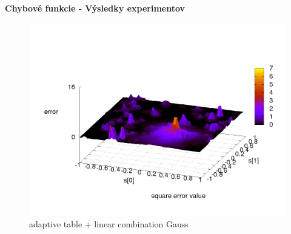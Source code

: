 \documentclass[xcolor=dvipsnames]{beamer}
\begin{document}
\begin{frame}{\bf Chybové funkcie - Výsledky experimentov}
\begin{minipage}{.5\textwidth}
\begin{figure}[!htb]
\centering
\includegraphics[scale=.2]{../../results_q_learning/map_2/function_type_6/q_learning_error.png}
\caption{adaptive table + linear combination Gauss}
\end{figure}


\end{minipage}
\end{frame}
\end{document}
